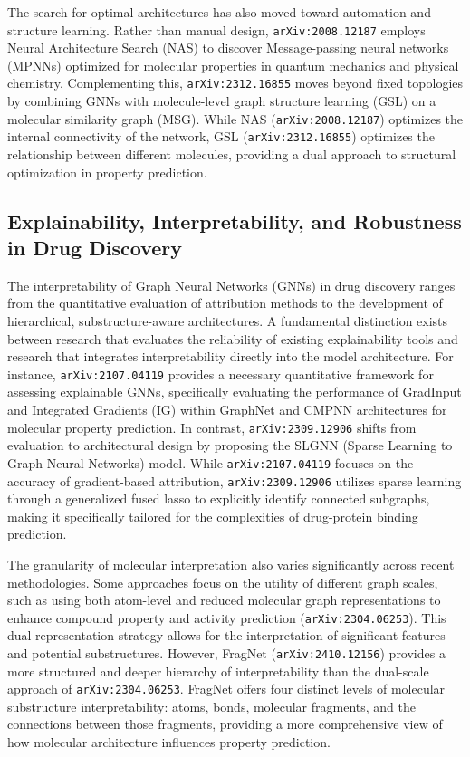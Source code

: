 \documentclass[11pt]{article}
\begin{document}
The search for optimal architectures has also moved toward automation and structure learning. Rather than manual design, \texttt{arXiv:2008.12187} employs Neural Architecture Search (NAS) to discover Message-passing neural networks (MPNNs) optimized for molecular properties in quantum mechanics and physical chemistry. Complementing this, \texttt{arXiv:2312.16855} moves beyond fixed topologies by combining GNNs with molecule-level graph structure learning (GSL) on a molecular similarity graph (MSG). While NAS (\texttt{arXiv:2008.12187}) optimizes the internal connectivity of the network, GSL (\texttt{arXiv:2312.16855}) optimizes the relationship between different molecules, providing a dual approach to structural optimization in property prediction.

\subsection{Explainability, Interpretability, and Robustness in Drug Discovery}

The interpretability of Graph Neural Networks (GNNs) in drug discovery ranges from the quantitative evaluation of attribution methods to the development of hierarchical, substructure-aware architectures. A fundamental distinction exists between research that evaluates the reliability of existing explainability tools and research that integrates interpretability directly into the model architecture. For instance, \texttt{arXiv:2107.04119} provides a necessary quantitative framework for assessing explainable GNNs, specifically evaluating the performance of GradInput and Integrated Gradients (IG) within GraphNet and CMPNN architectures for molecular property prediction. In contrast, \texttt{arXiv:2309.12906} shifts from evaluation to architectural design by proposing the SLGNN (Sparse Learning to Graph Neural Networks) model. While \texttt{arXiv:2107.04119} focuses on the accuracy of gradient-based attribution, \texttt{arXiv:2309.12906} utilizes sparse learning through a generalized fused lasso to explicitly identify connected subgraphs, making it specifically tailored for the complexities of drug-protein binding prediction.

The granularity of molecular interpretation also varies significantly across recent methodologies. Some approaches focus on the utility of different graph scales, such as using both atom-level and reduced molecular graph representations to enhance compound property and activity prediction (\texttt{arXiv:2304.06253}). This dual-representation strategy allows for the interpretation of significant features and potential substructures. However, FragNet (\texttt{arXiv:2410.12156}) provides a more structured and deeper hierarchy of interpretability than the dual-scale approach of \texttt{arXiv:2304.06253}. FragNet offers four distinct levels of molecular substructure interpretability: atoms, bonds, molecular fragments, and the connections between those fragments, providing a more comprehensive view of how molecular architecture influences property prediction.
\end{document}
